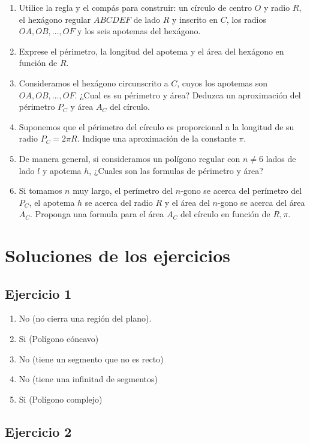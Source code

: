 \begin{enumerate}
\item Utilice la regla y el compás para construir: un círculo de centro $O$
  y radio $R$, el hexágono regular $ABCDEF$ de lado $R$ y inscrito en $C$,
  los radios ${OA}, {OB}, \ldots, {OF}$ y los seis apotemas del hexágono.
\item Exprese el périmetro, la longitud del apotema
   y el área del hexágono en función de $R$.
\item Consideramos el hexágono circunscrito a $C$, cuyos los apotemas
  son ${OA}, {OB}, \ldots, {OF}$. ¿Cual es su périmetro y
  área? Deduzca un aproximación del périmetro $P_C$ y área $A_C$ del círculo.
\item Suponemos que el périmetro del círculo es proporcional a la longitud
  de su radio $P_C = 2 \pi R$. Indique una aproximación de la constante $\pi$.
\item De manera general, si consideramos un polígono regular con $n \neq 6$
  lados de lado $l$ y apotema $h$, ¿Cuales son las formulas de périmetro y área?
\item Si tomamos $n$ muy largo, el perímetro del $n$-gono se acerca del
  perímetro del $P_C$, el apotema $h$ se acerca del radio $R$ y
  el área del $n$-gono se acerca del área $A_C$.
  Proponga una formula para el área $A_C$ del círculo en función de $R,\pi$.
\end{enumerate}

\section{Soluciones de los ejercicios}

\subsection{Ejercicio 1}

\begin{enumerate}

\item No (no cierra una región del plano).
\item Si (Polígono cóncavo)
\item No (tiene un segmento que no es recto)
\item No (tiene una infinitad de segmentos)
\item Si (Polígono complejo)
\end{enumerate}

\subsection{Ejercicio 2}

